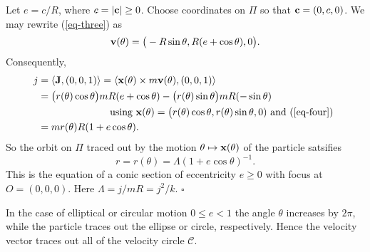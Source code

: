 \documentclass[11pt,openbib]{article}
\begin{document}
\noindent Let $e = c/R$, where $c = |{\bf c}| \ge 0$. Choose coordinates on 
$\Pi $ so that ${\bf c} = (0,c,0)$. We may rewrite (\ref{eq-three}) as 
\begin{equation}
{\bf v}(\theta ) = \big( -R \sin \theta , R(e+ \cos \theta ) , 0  \big) . 
\label{eq-four}
\end{equation}
Consequently, 
\begin{align}
j & = \langle {\bf J}, (0,0,1) \rangle = \langle {\bf x}(\theta ) \times m {\bf v}(\theta ), (0,0,1) \rangle \notag \\
& = \big( r(\theta ) \cos \theta \big) mR (e +\cos \theta ) - \big( r(\theta ) \sin \theta \big) mR (-\sin \theta ) \notag \\
& \hspace{1in}\mbox{using ${\bf x}(\theta ) = \big( r(\theta ) \cos \theta , r(\theta )\sin \theta , 0)$ and 
(\ref{eq-four}) } \notag \\
& = m r(\theta ) R (1 + e \cos \theta ) . \notag 
\end{align}
So the orbit on $\Pi $ traced out by the motion $\theta \mapsto {\bf x}(\theta )$ of the particle satsifies 
\begin{equation}
r = r(\theta ) = \Lambda (1+e \cos \theta )^{-1}. 
\label{eq-five}
\end{equation}
This is the equation of a conic section of eccentricity $e \ge 0$ with focus at $O = (0,0,0)$. Here 
$\Lambda = j/mR = j^2/k$. \hfill $\square $ \medskip 

\noindent In the case of elliptical or circular motion $0 \le e < 1$ the angle $\theta $ increases by $2\pi $, while 
the particle traces out the ellipse or circle, respectively. Hence the velocity vector traces out all of the velocity circle 
$\mathcal{C}$. \medskip 
\end{document}
